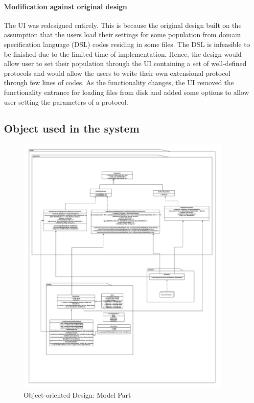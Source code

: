 \paragraph{Modification against original design}
The UI was redesigned entirely. This is because the original design built on the assumption
that the users load their settings for some population from domain specification language (DSL) codes residing in
some files. The DSL is infeasible to be finished due to the limited time of implementation.
Hence, the design would allow user to set their population through the UI containing a set of well-defined
protocols and would allow the users to write their own extensional protocol through few lines of codes.
As the functionality changes, the UI removed the functionality entrance for loading files from disk and
added some options to allow user setting the parameters of a protocol.

\subsection{Object used in the system}
\FloatBarrier
\begin{figure}[H]
\begin{center}
\includegraphics[width =0.95\textwidth]{context/diagram/uml_model.pdf}
\caption{Object-oriented Design: Model Part}
\label{oomG}
\end{center}
\end{figure}

